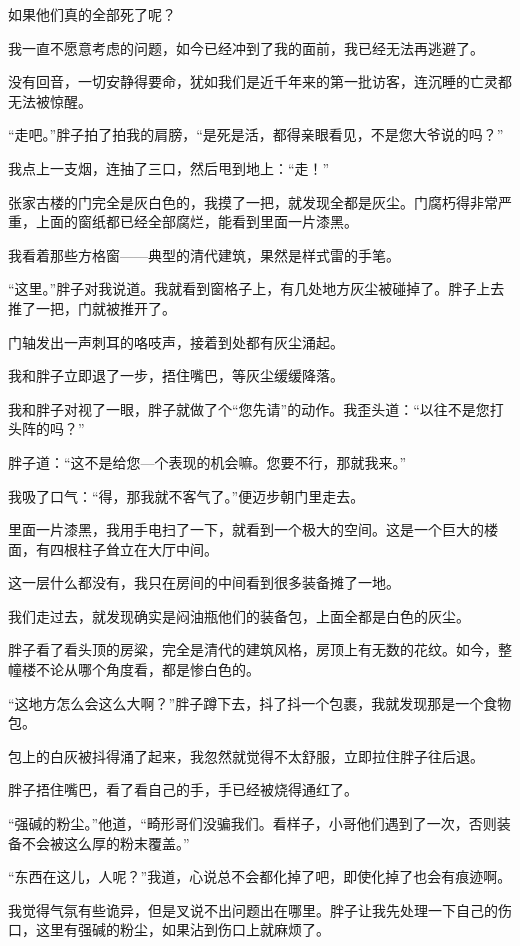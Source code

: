 如果他们真的全部死了呢？

我一直不愿意考虑的问题，如今已经冲到了我的面前，我已经无法再逃避了。

没有回音，一切安静得要命，犹如我们是近千年来的第一批访客，连沉睡的亡灵都无法被惊醒。

“走吧。”胖子拍了拍我的肩膀，“是死是活，都得亲眼看见，不是您大爷说的吗？”

我点上一支烟，连抽了三口，然后甩到地上：“走！”

张家古楼的门完全是灰白色的，我摸了一把，就发现全都是灰尘。门腐朽得非常严重，上面的窗纸都已经全部腐烂，能看到里面一片漆黑。

我看着那些方格窗——典型的清代建筑，果然是样式雷的手笔。

“这里。”胖子对我说道。我就看到窗格子上，有几处地方灰尘被碰掉了。胖子上去推了一把，门就被推开了。

门轴发出一声刺耳的咯吱声，接着到处都有灰尘涌起。

我和胖子立即退了一步，捂住嘴巴，等灰尘缓缓降落。

我和胖子对视了一眼，胖子就做了个“您先请”的动作。我歪头道：“以往不是您打头阵的吗？”

胖子道：“这不是给您—个表现的机会嘛。您要不行，那就我来。”

我吸了口气：“得，那我就不客气了。”便迈步朝门里走去。

里面一片漆黑，我用手电扫了一下，就看到一个极大的空间。这是一个巨大的楼面，有四根柱子耸立在大厅中间。

这一层什么都没有，我只在房间的中间看到很多装备摊了一地。

我们走过去，就发现确实是闷油瓶他们的装备包，上面全都是白色的灰尘。

胖子看了看头顶的房粱，完全是清代的建筑风格，房顶上有无数的花纹。如今，整幢楼不论从哪个角度看，都是惨白色的。

“这地方怎么会这么大啊？”胖子蹲下去，抖了抖一个包裹，我就发现那是一个食物包。

包上的白灰被抖得涌了起来，我忽然就觉得不太舒服，立即拉住胖子往后退。

胖子捂住嘴巴，看了看自己的手，手已经被烧得通红了。

“强碱的粉尘。”他道，“畸形哥们没骗我们。看样子，小哥他们遇到了一次，否则装备不会被这么厚的粉末覆盖。”

“东西在这儿，人呢？”我道，心说总不会都化掉了吧，即使化掉了也会有痕迹啊。

我觉得气氛有些诡异，但是叉说不出问题出在哪里。胖子让我先处理一下自己的伤口，这里有强碱的粉尘，如果沾到伤口上就麻烦了。


